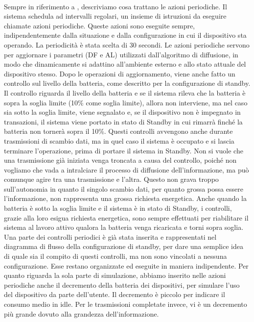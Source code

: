 \\
Sempre in riferimento a , descriviamo cosa trattano le azioni periodiche. Il sistema schedula ad intervalli regolari, un insieme di istruzioni da eseguire chiamate azioni periodiche. Queste azioni sono eseguite sempre, indipendentemente dalla situazione e dalla configurazione in cui il dispositivo sta operando. La periodicità è stata scelta di 30 secondi. Le azioni periodiche servono per aggiornare i parametri (\acs{DF} e \acs{AL}) utilizzati dall'algoritmo di diffusione, in modo che dinamicamente si adattino all'ambiente esterno e allo stato attuale del dispositivo stesso. Dopo le operazioni di aggiornamento, viene anche fatto un controllo sul livello della batteria, come descritto per la configurazione di standby. Il controllo riguarda il livello della batteria e se il sistema rileva che la batteria è sopra la soglia limite (10\% come soglia limite), allora non interviene, ma nel caso sia sotto la soglia limite, viene segnalato e, se il dispositivo non è impegnato in transazioni, il sistema viene portato in stato di Standby in cui rimarrà finché la batteria non tornerà sopra il 10\%. Questi controlli avvengono anche durante trasmissioni di scambio dati, ma in quel caso il sistema è occupato e si lascia terminare l'operazione, prima di portare il sistema in Standby. Non si vuole che una trasmissione già iniziata venga troncata a causa del controllo, poiché non vogliamo che vada a intralciare il processo di diffusione dell'informazione, ma può comunque agire tra una trasmissione e l'altra. Questo non grava troppo sull'autonomia in quanto il singolo scambio dati, per quanto grossa possa essere l'informazione, non rappresenta una grossa richiesta energetica. Anche quando la batteria è sotto la soglia limite e il sistema è in stato di Standby, i controlli, grazie alla loro esigua richiesta energetica, sono sempre effettuati per riabilitare il sistema al lavoro attivo qualora la batteria venga ricaricata e torni sopra soglia. Una parte dei controlli periodici è già stata inserita e rappresentati nel diagramma di flusso della configurazione di standby, per dare una semplice idea di quale sia il compito di questi controlli, ma non sono vincolati a nessuna configurazione. Esse restano organizzate ed eseguite in maniera indipendente. Per quanto riguarda la sola parte di simulazione, abbiamo inserito nelle azioni periodiche anche il decremento della batteria dei dispositivi, per simulare l'uso del dispositivo da parte dell'utente. Il decremento è piccolo per indicare il consumo medio in idle. Per le trasmissioni completate invece, vi è un decremento più grande dovuto alla grandezza dell'informazione.
\bigskip

